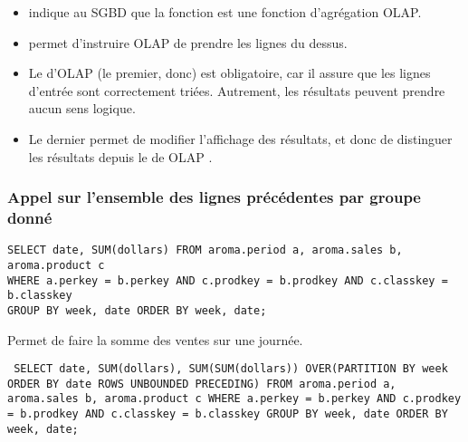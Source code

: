 \begin{itemize}
    \item {} indique au SGBD que la fonction  est une fonction d'agrégation OLAP.
    \item {} permet d'instruire OLAP de prendre les lignes du dessus.
    \item Le  d'OLAP (le premier, donc) est obligatoire, car il assure que les lignes d'entrée sont correctement triées. Autrement, les résultats peuvent prendre aucun sens logique.
    \item Le dernier  permet de modifier l'affichage des résultats, et donc de distinguer les résultats depuis le  de OLAP .
\end{itemize}

\subsubsection{Appel sur l'ensemble des lignes précédentes par groupe donné}
\begin{lstlisting}
SELECT date, SUM(dollars) FROM aroma.period a, aroma.sales b, aroma.product c 
WHERE a.perkey = b.perkey AND c.prodkey = b.prodkey AND c.classkey = b.classkey 
GROUP BY week, date ORDER BY week, date;
\end{lstlisting}

Permet de faire la somme des ventes sur une journée.

\begin{lstlisting}
 SELECT date, SUM(dollars), SUM(SUM(dollars)) OVER(PARTITION BY week ORDER BY date ROWS UNBOUNDED PRECEDING) FROM aroma.period a, aroma.sales b, aroma.product c WHERE a.perkey = b.perkey AND c.prodkey = b.prodkey AND c.classkey = b.classkey GROUP BY week, date ORDER BY week, date;

\end{lstlisting}

